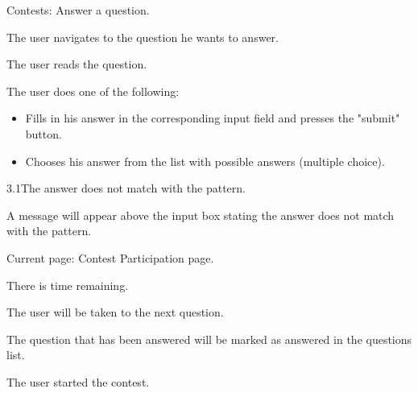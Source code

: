 \begin{uc}{Contests: Answer a question.}

    \begin{uc-mss}
    	\item The user navigates to the question he wants to answer. 
    	\item The user reads the question.
    	\item The user does one of the following:
		\begin{itemize}
			\item Fills in his answer in the corresponding input field and presses the "submit" button.
			\item Chooses his answer from the list with possible answers (multiple choice).
		\end{itemize}
    \end{uc-mss}

    \begin{uc-ext}

        \begin{uc-fail}{3.1}{The answer does not match with the pattern.}
        	\item A message will appear above the input box stating the answer does not match with the pattern.
        \end{uc-fail}

    \end{uc-ext}

    \begin{uc-pre}
    \item Current page: Contest Participation page.
    \item There is time remaining. 
    \end{uc-pre}

    \begin{uc-post}
    \item The user will be taken to the next question.
    \item The question that has been answered will be marked as answered in the questions list. 
    \end{uc-post}

    \begin{uc-trig}
    The user started the contest. 
    \end{uc-trig}

\end{uc}
